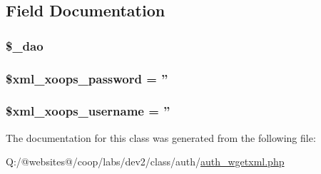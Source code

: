\subsection{Field Documentation}
\hypertarget{class_xortify_auth_wgetxml_a12a029c610f699b4b25e79a1f64a3485}{
\subsubsection[{\$\-\_\-dao}]{\setlength{\rightskip}{0pt plus 5cm}\$\-\_\-dao}}\label{class_xortify_auth_wgetxml_a12a029c610f699b4b25e79a1f64a3485}
\hypertarget{class_xortify_auth_wgetxml_a8ec2889165c837354fded1cedbd42157}{
\subsubsection[{\$xml\-\_\-xoops\-\_\-password}]{\setlength{\rightskip}{0pt plus 5cm}\$xml\-\_\-xoops\-\_\-password = ''}}\label{class_xortify_auth_wgetxml_a8ec2889165c837354fded1cedbd42157}
\hypertarget{class_xortify_auth_wgetxml_a725df0dd6b578e15522ed15945e5901c}{
\subsubsection[{\$xml\-\_\-xoops\-\_\-username}]{\setlength{\rightskip}{0pt plus 5cm}\$xml\-\_\-xoops\-\_\-username = ''}}\label{class_xortify_auth_wgetxml_a725df0dd6b578e15522ed15945e5901c}


The documentation for this class was generated from the following file\-:\begin{DoxyCompactItemize}
\item 
Q\-:/@websites@/coop/labs/dev2/class/auth/\hyperlink{auth__wgetxml_8php}{auth\-\_\-wgetxml.\-php}\end{DoxyCompactItemize}
